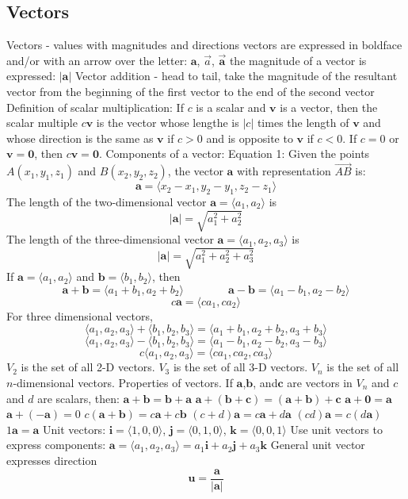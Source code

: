 \documentclass{article}
\begin{document}
    \subsection{Vectors}
    \begin{outline}
        \1 Vectors - values with magnitudes and directions
        \1 vectors are expressed in boldface and/or with an arrow over the letter: \(\mathbf{a}\), \(\vec{a}\), \(\vec{\mathbf{a}}\)
        \1 the magnitude of a vector is expressed: \(|\mathbf{a}|\)
        \1 Vector addition - head to tail, take the magnitude of the resultant vector from the beginning of the first vector to the end of the second vector 
        \1 Definition of scalar multiplication: If $c$ is a scalar and $\mathbf{v}$ is a vector, then the scalar multiple \(c\mathbf v\) is the vector whose lengthe is \(|c|\) times the length of \(\mathbf v\) and whose direction is the same as \(\mathbf v\) if \(c>0\) and is opposite to \(\mathbf v\) if \(c<0\). If \(c=0\) or \(\mathbf{v=0}\), then \(c\mathbf{v=0}\). 
        \1 Components of a vector: Equation 1: Given the points \(A(x_1,y_1,z_1)\) and \(B(x_2,y_2,z_2)\), the vector \(\mathbf a\) with representation \(\vec{AB}\) is: \[\mathbf a=\langle x_2-x_1, y_2-y_1,z_2-z_1\rangle\]
        \1 The length of the two-dimensional vector \(\mathbf a=\langle a_1,a_2\rangle\) is \[|\mathbf a|=\sqrt{a^2_1+a_2^2}\]
        \1 The length of the three-dimensional vector \(\mathbf a=\langle a_1,a_2,a_3\rangle\) is \[|\mathbf a|=\sqrt{a^2_1+a_2^2+a_3^2}\]
        \1 If \(\mathbf a=\langle a_1,a_2\rangle\) and \(\mathbf b=\langle b_1,b_2\rangle\), then \[\mathbf a+\mathbf b=\langle a_1+b_1,a_2+b_2\rangle\qquad\qquad\mathbf a-\mathbf b=\langle a_1-b_1,a_2-b_2\rangle\]\[c\mathbf a=\langle ca_1,ca_2\rangle \]
        \1 For three dimensional vectors, \[\langle a_1,a_2,a_3\rangle+\langle b_1, b_2,b_3\rangle=\langle a_1+b_1, a_2+b_2,a_3+b_3\rangle\]\[\langle a_1,a_2,a_3\rangle-\langle b_1, b_2,b_3\rangle=\langle a_1-b_1, a_2-b_2, a_3-b_3\rangle\]\[c\langle a_1,a_2,a_3\rangle=\langle ca_1,ca_2,ca_3\rangle\]
        \1 \(V_2\) is the set of all 2-D vectors. \(V_3\) is the set of all 3-D vectors. \(V_n\) is the set of all $n$-dimensional vectors. 
        \1 Properties of vectors. If \(\mathbf a\),\(\mathbf{b}\), and\(\mathbf c\) are vectors in \(V_n\) and $c$ and $d$ are scalars, then: 
            \2 \(\mathbf a+\mathbf b=\mathbf b+\mathbf a\)
            \2 \(\mathbf a+(\mathbf b+\mathbf c)=(\mathbf a+\mathbf b)+\mathbf c\)
            \2 \(\mathbf a+\mathbf 0=\mathbf a\)
            \2 \(\mathbf a+(-\mathbf a)=0\)
            \2 \(c(\mathbf a+\mathbf b)=c\mathbf a+c\mathbf b\)
            \2 \((c+d)\mathbf a=c\mathbf a+d\mathbf a\)
            \2 \((cd)\mathbf a=c(d\mathbf a)\)
            \2 \(1\mathbf a=\mathbf a\)
        \1 Unit vectors: \(\mathbf i=\langle 1,0,0\rangle\), \(\mathbf j=\langle 0,1,0\rangle\), \(\mathbf k=\langle 0,0,1\rangle\)
        \1 Use unit vectors to express components: \(\mathbf a=\langle a_1,a_2,a_3\rangle=a_1\mathbf i+a_2\mathbf j+a_3\mathbf k\)
        \1 General unit vector expresses direction \[\mathbf u=\dfrac{\mathbf a}{|\mathbf a|}\]
        \1 

    \end{outline}
\end{document}
